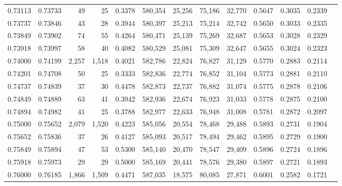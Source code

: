 \begin{tabular}{rrrrrrrrrrrrr}
0.73113 & 0.73733 &     49 &    25 &                                     0.3378 & 580,354 &  25,256 &  75,186 &  32,770 & 0.5647 & 0.3035 & 0.2339 \\
0.73737 & 0.73846 &     43 &    28 &                                     0.3944 & 580,397 &  25,213 &  75,214 &  32,742 & 0.5650 & 0.3033 & 0.2335 \\
0.73849 & 0.73902 &     74 &    55 &                                     0.4264 & 580,471 &  25,139 &  75,269 &  32,687 & 0.5653 & 0.3028 & 0.2329 \\
0.73918 & 0.73997 &     58 &    40 &                                     0.4082 & 580,529 &  25,081 &  75,309 &  32,647 & 0.5655 & 0.3024 & 0.2323 \\
0.74000 & 0.74199 &  2,257 & 1,518 &                                     0.4021 & 582,786 &  22,824 &  76,827 &  31,129 & 0.5770 & 0.2883 & 0.2114 \\
0.74201 & 0.74708 &     50 &    25 &                                     0.3333 & 582,836 &  22,774 &  76,852 &  31,104 & 0.5773 & 0.2881 & 0.2110 \\
0.74737 & 0.74839 &     37 &    30 &                                     0.4478 & 582,873 &  22,737 &  76,882 &  31,074 & 0.5775 & 0.2878 & 0.2106 \\
0.74849 & 0.74889 &     63 &    41 &                                     0.3942 & 582,936 &  22,674 &  76,923 &  31,033 & 0.5778 & 0.2875 & 0.2100 \\
0.74894 & 0.74982 &     41 &    25 &                                     0.3788 & 582,977 &  22,633 &  76,948 &  31,008 & 0.5781 & 0.2872 & 0.2097 \\
0.75000 & 0.75652 &  2,079 & 1,520 &                                     0.4223 & 585,056 &  20,554 &  78,468 &  29,488 & 0.5893 & 0.2731 & 0.1904 \\
0.75652 & 0.75836 &     37 &    26 &                                     0.4127 & 585,093 &  20,517 &  78,494 &  29,462 & 0.5895 & 0.2729 & 0.1900 \\
0.75849 & 0.75894 &     47 &    53 &                                     0.5300 & 585,140 &  20,470 &  78,547 &  29,409 & 0.5896 & 0.2724 & 0.1896 \\
0.75918 & 0.75973 &     29 &    29 &                                     0.5000 & 585,169 &  20,441 &  78,576 &  29,380 & 0.5897 & 0.2721 & 0.1893 \\
0.76000 & 0.76185 &  1,866 & 1,509 &                                     0.4471 & 587,035 &  18,575 &  80,085 &  27,871 & 0.6001 & 0.2582 & 0.1721 \\

\end{tabular}
